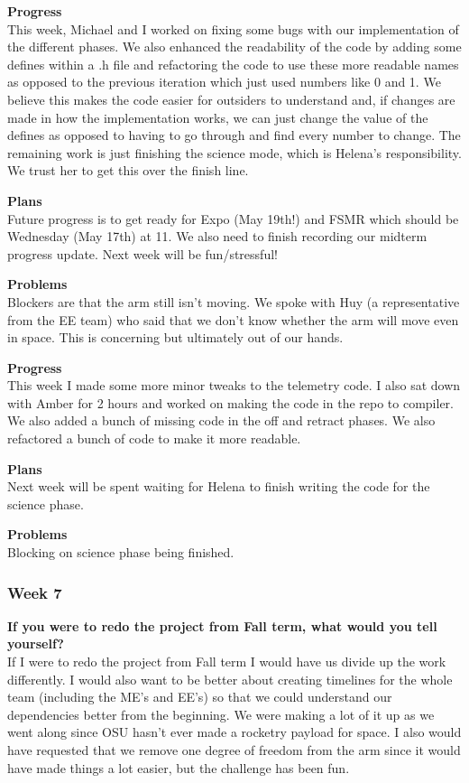 \textbf{Progress} \\ 
This week, Michael and I worked on fixing some bugs with our implementation of the different phases. We also enhanced the readability of the code by 
adding some defines within a .h file and refactoring the code to use these more readable names as opposed to the previous iteration which just used 
numbers like 0 and 1. We believe this makes the code easier for outsiders to understand and, if changes are made in how the implementation works, we can 
just change the value of the defines as opposed to having to go through and find every number to change. The remaining work is just finishing the science 
mode, which is Helena's responsibility. We trust her to get this over the finish line.

\textbf{Plans} \\ 
Future progress is to get ready for Expo (May 19th!) and FSMR which should be Wednesday (May 17th) at 11. We also need to finish recording our midterm 
progress update. Next week will be fun/stressful!

\textbf{Problems} \\ 
Blockers are that the arm still isn't moving. We spoke with Huy (a representative from the EE team) who said that we don't know whether the arm will move 
even in space. This is concerning but ultimately out of our hands.

\textbf{Progress} \\
This week I made some more minor tweaks to the telemetry code. I also sat down with Amber for 2 hours and worked on making the code in the repo to compiler. We also added a bunch of missing code in the off and retract phases. We also refactored a bunch of code to make it more readable.

\textbf{Plans} \\
Next week will be spent waiting for Helena to finish writing the code for the science phase.

\textbf{Problems} \\
Blocking on science phase being finished.

\subsubsection{Week 7}
\textbf{If you were to redo the project from Fall term, what would you tell yourself?} \\ 
If I were to redo the project from Fall term I would have us divide up the work differently. I would also want to be better about creating timelines for the whole team (including the ME's and EE's) so that we could understand our dependencies better from the beginning. We were making a lot of it up as we went along since OSU hasn't ever made a rocketry payload for space. I also would have requested that we remove one degree of freedom from the arm since it would have made things a lot easier, but the challenge has been fun.

